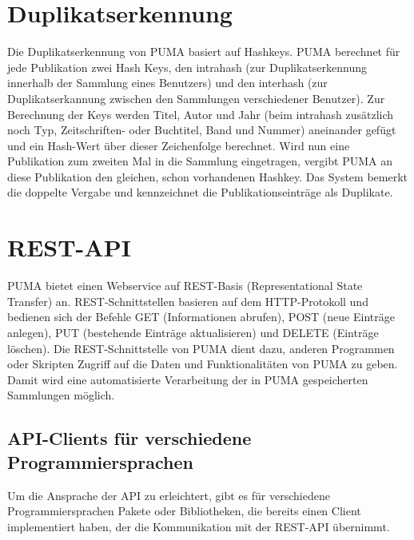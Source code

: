 \section{Duplikatserkennung} 
\label{sec:duplikat}
Die Duplikatserkennung von PUMA basiert auf Hashkeys. PUMA berechnet für jede Publikation zwei Hash Keys, den intrahash (zur Duplikatserkennung innerhalb der Sammlung eines Benutzers) und den interhash (zur Duplikatserkannung zwischen den Sammlungen verschiedener Benutzer). Zur Berechnung der Keys werden Titel, Autor und Jahr (beim intrahash zusätzlich noch Typ, Zeitschriften- oder Buchtitel, Band und Nummer) aneinander gefügt und ein Hash-Wert über dieser Zeichenfolge berechnet. Wird nun eine Publikation zum zweiten Mal in die Sammlung eingetragen, vergibt PUMA an diese Publikation den gleichen, schon vorhandenen Hashkey. Das System bemerkt die doppelte Vergabe und kennzeichnet die Publikationseinträge als Duplikate. 


\section{REST-API}
\label{sec:restApi}
PUMA bietet einen Webservice auf REST-Basis (Representational State Transfer) an. REST-Schnittstellen basieren auf dem HTTP-Protokoll und bedienen sich der Befehle GET (Informationen abrufen), POST (neue Einträge anlegen), PUT (bestehende Einträge aktualisieren) und DELETE (Einträge löschen). Die REST-Schnittstelle von PUMA dient dazu, anderen Programmen oder Skripten Zugriff auf die Daten und Funktionalitäten von PUMA zu geben. Damit wird eine automatisierte Verarbeitung der in PUMA gespeicherten Sammlungen möglich.

\subsection{API-Clients für verschiedene Programmiersprachen}
\label{subsec:apiClients}
Um die Ansprache der API zu erleichtert, gibt es für verschiedene Programmiersprachen Pakete oder Bibliotheken, die bereits einen Client implementiert haben, der die Kommunikation mit der REST-API übernimmt.

